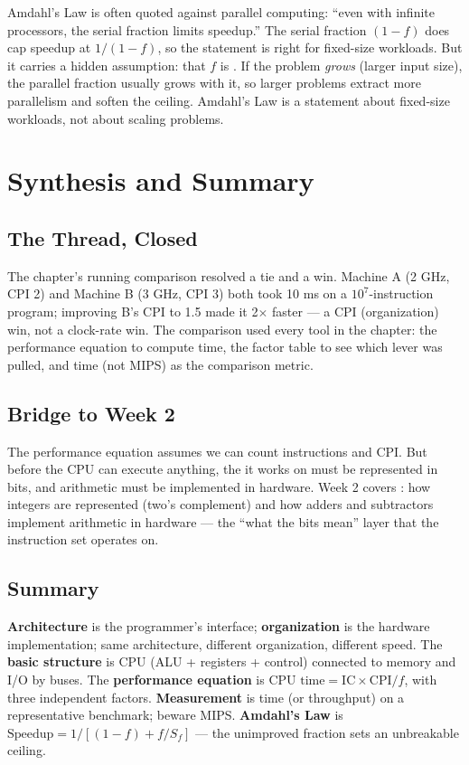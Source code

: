 \documentclass[11pt]{article}
\begin{document}
Amdahl's Law is often quoted against parallel computing: ``even with infinite processors, the serial fraction limits speedup.'' The serial fraction $(1-f)$ does cap speedup at $1/(1-f)$, so the statement is right for fixed-size workloads. But it carries a hidden assumption: that $f$ is . If the problem \emph{grows} (larger input size), the parallel fraction usually grows with it, so larger problems extract more parallelism and soften the ceiling. Amdahl's Law is a statement about fixed-size workloads, not about scaling problems.

\section{Synthesis and Summary}

\subsection{The Thread, Closed}

The chapter's running comparison resolved a tie and a win. Machine A (2 GHz, CPI 2) and Machine B (3 GHz, CPI 3) both took 10 ms on a $10^7$-instruction program; improving B's CPI to 1.5 made it 2$\times$ faster --- a CPI (organization) win, not a clock-rate win. The comparison used every tool in the chapter: the performance equation to compute time, the factor table to see which lever was pulled, and time (not MIPS) as the comparison metric.

\subsection{Bridge to Week 2}

The performance equation assumes we can count instructions and CPI. But before the CPU can execute anything, the  it works on must be represented in bits, and arithmetic must be implemented in hardware. Week 2 covers : how integers are represented (two's complement) and how adders and subtractors implement arithmetic in hardware --- the ``what the bits mean'' layer that the instruction set operates on.

\subsection{Summary}

\textbf{Architecture} is the programmer's interface; \textbf{organization} is the hardware implementation; same architecture, different organization, different speed. The \textbf{basic structure} is CPU (ALU + registers + control) connected to memory and I/O by buses. The \textbf{performance equation} is $\text{CPU time} = \text{IC} \times \text{CPI} / f$, with three independent factors. \textbf{Measurement} is time (or throughput) on a representative benchmark; beware MIPS. \textbf{Amdahl's Law} is $\text{Speedup} = 1\big/[(1-f) + f/S_f]$ --- the unimproved fraction sets an unbreakable ceiling.



\end{document}
